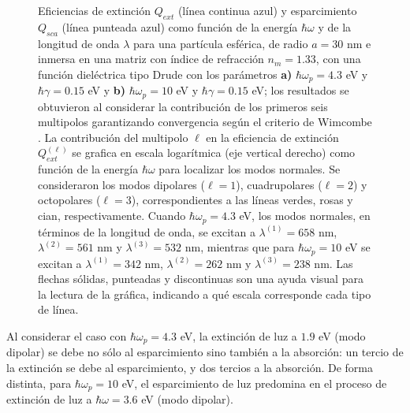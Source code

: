 \begin{figure}[h!]
	\caption{Eficiencias de extinción $Q_{ext}$ (línea continua azul) y esparcimiento $Q_{sca}$ (línea punteada azul) como función de la energía $\hbar\omega$ y de la longitud de onda $\lambda$ para una partícula esférica, de radio $a=30$ nm e inmersa en una matriz con índice de refracción $n_m=1.33$, con una función dieléctrica tipo Drude con los parámetros \textbf{a)} $\hbar\omega_p=4.3$ eV y $\hbar\gamma = 0.15$ eV y \textbf{b)} $\hbar\omega_p=10$ eV y $\hbar\gamma = 0.15$ eV; los resultados se obtuvieron al considerar la contribución de los primeros seis multipolos garantizando convergencia según el criterio de Wimcombe \cite{bohren1998absorption}. La contribución del multipolo $\ell$ en la eficiencia de extinción $Q_{ext}^{(\ell)}$ se grafica en escala logarítmica (eje vertical derecho) como función de la energía $\hbar\omega$ para localizar los modos normales. Se consideraron los modos dipolares ($\ell =1$), cuadrupolares ($\ell = 2$) y octopolares ($\ell = 3$), correspondientes a las líneas verdes, rosas y cian, respectivamente.  Cuando $\hbar\omega_p = 4.3$ eV, los modos normales, en términos de la longitud de onda, se excitan a $\lambda^{(1)}= 658$ nm, $\lambda^{(2)}= 561$ nm y $\lambda^{(3)}= 532 $ nm, mientras que para $\hbar\omega_p = 10$ eV se excitan a $\lambda^{(1)}= 342$ nm, $\lambda^{(2)}= 262$ nm y $\lambda^{(3)}= 238$ nm. Las flechas sólidas, punteadas y discontinuas son una ayuda visual para la lectura de la gráfica, indicando a qué escala corresponde cada tipo de línea.}
	\label{fig:QextDrude}
	\end{figure}	

Al considerar el caso con $\hbar\omega_p = 4.3$ eV, la extinción de luz a $1.9$ eV (modo dipolar) se debe no sólo al esparcimiento sino también a la absorción: un tercio de la extinción se debe al esparcimiento, y dos tercios a la absorción. De forma distinta, para $\hbar\omega_p = 10$ eV, el esparcimiento de luz predomina en el proceso de extinción de luz a $\hbar\omega= 3.6	$ eV (modo dipolar).












